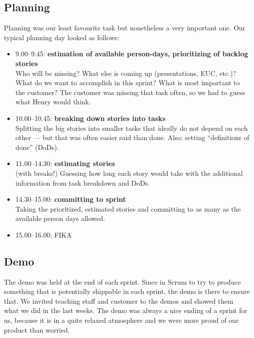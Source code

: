 \documentclass[11pt,a4paper]{report}
\begin{document}
\subsection{Planning}
Planning was our least favourite task but nonetheless a very important one.
Our typical planning day looked as follows:
\begin{itemize}
\item 9.00--9.45: {\bf estimation of available person-days,
  prioritizing of backlog stories}\\
  Who will be missing? What else is coming up (presentations, EUC, etc.)?
  What do we want to accomplish in this sprint?
  What is most important to the customer? The customer was missing that task
  often, so we had to guess what Henry would think.
\item 10.00--10.45: {\bf breaking down stories into tasks}\\
  Splitting the big stories into smaller tasks that ideally do not depend on
  each other --- but that was often easier said than done.
  Also: setting ``definitions of done'' (DoDs).
\item 11.00--14.30: {\bf estimating stories}\\
  (with breaks!)
  Guessing how long each story would take with the additional information from
  task breakdown and DoDs.
\item 14.30--15.00: {\bf committing to sprint}\\
  Taking the prioritized, estimated stories and committing to as many as the
  available person days allowed.
\item 15.00--16.00: FIKA
\end{itemize}

\subsection{Demo}
The demo was held at the end of each sprint. Since in Scrum to try to produce
something that is potentially shippable in each sprint, the demo is there to
ensure that. We invited teaching staff and customer to the demos and showed them
what we did in the last weeks. The demo was always a nice ending of a sprint for
us, because it is in a quite relaxed atmosphere and we were more proud of our
product than worried.
\end{document}
